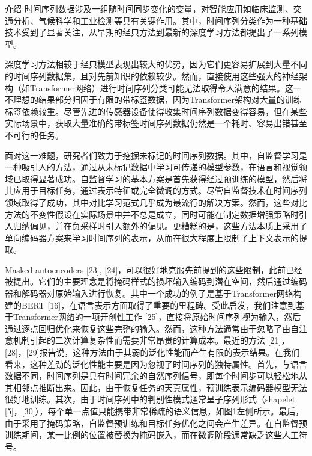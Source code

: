 \documentclass[a4paper,12pt]{article}
\begin{document}
\begin{section}{介绍}
时间序列数据涉及一组随时间同步变化的变量，对智能应用如临床监测、交通分析、气候科学和工业检测等具有关键作用。其中，时间序列分类作为一种基础技术受到了显著关注，从早期的经典方法到最新的深度学习方法都提出了一系列模型。

深度学习方法相较于经典模型表现出较大的优势，因为它们更容易扩展到大量不同的时间序列数据集，且对先前知识的依赖较少。然而，直接使用这些强大的神经架构（如Transformer网络）进行时间序列分类可能无法取得令人满意的结果。这一不理想的结果部分归因于有限的带标签数据，因为Transformer架构对大量的训练标签依赖较重。尽管先进的传感器设备使得收集时间序列数据变得容易，但在某些实际场景中，获取大量准确的带标签时间序列数据仍然是一个耗时、容易出错甚至不可行的任务。
    
面对这一难题，研究者们致力于挖掘未标记的时间序列数据。其中，自监督学习是一种吸引人的方法，通过从未标记数据中学习可传递的模型参数，在语言和视觉领域已取得显著成功。自监督学习的基本方案是首先获得经过预训练的模型，然后将其应用于目标任务，通过表示特征或完全微调的方式。尽管自监督技术在时间序列领域取得了成功，其中对比学习范式几乎成为最流行的解决方案。然而，这些对比方法的不变性假设在实际场景中并不总是成立，同时可能在制定数据增强策略时引入归纳偏见，并在负采样时引入额外的偏见。更糟糕的是，这些方法本质上采用了单向编码器方案来学习时间序列的表示，从而在很大程度上限制了上下文表示的提取。

Masked autoencoders [23], [24]，可以很好地克服先前提到的这些限制，此前已经被提出。它们的主要理念是将掩码样式的损坏输入编码到潜在空间，然后通过编码器和解码器对原始输入进行恢复。其中一个成功的例子是基于Transformer网络构建的BERT [16]，在语言表示方面取得了重要的里程碑。受此启发，我们注意到基于Transformer网络的一项开创性工作 [25]，直接将原始时间序列视为输入，然后通过逐点回归优化来恢复这些完整的输入。然而，这种方法通常由于忽略了由自注意机制引起的二次计算复杂性而需要非常昂贵的计算成本。最近的方法 [21]，[28]，[29]报告说，这种方法由于其弱的泛化性能而产生有限的表示结果。在我们看来，这种差劲的泛化性能主要是因为忽视了时间序列的独特属性。首先，与语言数据不同，时间序列是具有时间冗余的自然序列信号，即每个时间步可以轻松地从其相邻点推断出来。因此，由于恢复任务的天真属性，预训练表示编码器模型无法很好地训练。其次，由于时间序列中的判别性模式通常呈子序列形式（shapelet [5]，[30]），每个单一点值只能携带非常稀疏的语义信息，如图1左侧所示。最后，由于采用了掩码策略，自监督预训练和目标任务优化之间会产生差异。在自监督预训练期间，某一比例的位置被替换为掩码嵌入，而在微调阶段通常缺乏这些人工符号。


\end{section}
\end{document}
